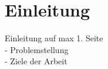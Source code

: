 \section{Einleitung}
\label{sec:Aufgabenstellung}

Einleitung auf max 1. Seite \\
- Problemstellung  \\
- Ziele der Arbeit \\